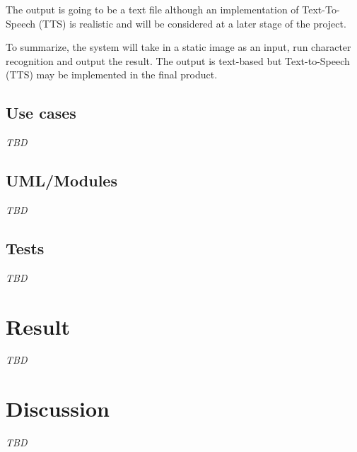 \documentclass[a4paper, english]{scrartcl}
\begin{document}
The output is going to be a text file although an implementation of
Text-To-Speech (TTS) is realistic and will be considered at a later stage of
the project.

To summarize, the system will take in a static image as an input, run
character recognition and output the result. The output is text-based but
Text-to-Speech (TTS) may be implemented in the final product.
\subsection{Use cases}
\textit{TBD}

\subsection{UML/Modules}
\textit{TBD}

\subsection{Tests}
\textit{TBD}

\section{Result}
\textit{TBD}

\section{Discussion}
\textit{TBD}

\pagebreak


\end{document}
